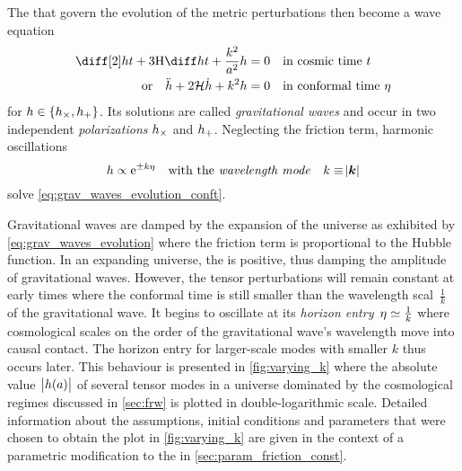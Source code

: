 \documentclass[parskip=half]{scrreprt}
\begin{document}
The  that govern the evolution of the metric perturbations then become a wave equation 
\begin{subequations}\label{eq:grav_waves_evolution}
\begin{align}
	\ddt{h} + 3 \Hcosm \dt{h} + \frac{k^2}{a^2} h &= 0 \quad \text{in cosmic time \(t\)} \\
	\text{or} \quad \ddconf{h} + 2 \Hconf \dconf{h} + k^2 h &= 0 \quad \text{in conformal time \(\conft\)} \label{eq:grav_waves_evolution_conft}
\end{align}
\end{subequations}
for \(h \in \cbr{\hcross, \hplus}\). Its solutions are called \emph{gravitational waves} and occur in two independent \emph{polarizations} \(h_\times\) and \(h_+\). Neglecting the friction term, harmonic oscillations
\begin{equation}
	h \propto \mathrm{e}^{\pm k \eta} \quad \text{with the \emph{wavelength mode}} \quad k \equiv \abs{\boldsymbol{k}}
\end{equation}
solve \eqref{eq:grav_waves_evolution_conft}.

Gravitational waves are damped by the expansion of the universe as exhibited by \eqref{eq:grav_waves_evolution} where the friction term is proportional to the Hubble function. In an expanding universe, the  is positive, thus damping the amplitude of gravitational waves. However, the tensor perturbations will remain constant at early times where the conformal time is still smaller than the wavelength scal~\(\frac{1}{k}\) of the gravitational wave. It begins to oscillate at its \emph{horizon entry}~\(\eta \simeq \frac{1}{k}\) where cosmological scales on the order of the gravitational wave's wavelength move into causal contact. The horizon entry for larger-scale modes with smaller \(k\) thus occurs later. This behaviour is presented in \autoref{fig:varying_k} where the absolute value~\(\abs{h(a)}\) of several tensor modes in a universe dominated by the cosmological regimes discussed in \autoref{sec:frw} is plotted in double-logarithmic scale. Detailed information about the assumptions, initial conditions and parameters that were chosen to obtain the plot in \autoref{fig:varying_k} are given in the context of a parametric modification to the  in \autoref{sec:param_friction_const}.
\end{document}
